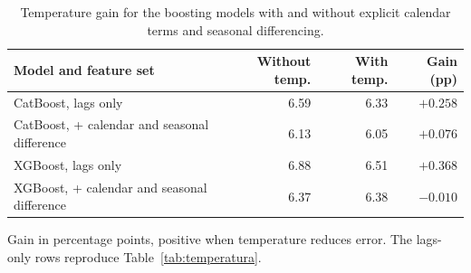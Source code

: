 \begin{table}[htbp]
\centering
\small
\setlength{\tabcolsep}{5pt}
\caption{Temperature gain for the boosting models with and without explicit calendar terms and seasonal differencing.}
\label{tab:tempdiffcal}
\begin{tabular}{lrrr}
\toprule
Model and feature set & Without temp. & With temp. & Gain (pp) \\
\midrule
CatBoost, lags only & 6.59 & 6.33 & $+0.258$ \\
CatBoost, + calendar and seasonal difference & 6.13 & 6.05 & $+0.076$ \\
\midrule
XGBoost, lags only & 6.88 & 6.51 & $+0.368$ \\
XGBoost, + calendar and seasonal difference & 6.37 & 6.38 & $-0.010$ \\
\bottomrule
\end{tabular}

\vspace{0.5em}
\begin{minipage}{\textwidth}
\footnotesize
Gain in percentage points, positive when temperature reduces error. The lags-only rows reproduce Table~\ref{tab:temperatura}.
\end{minipage}
\end{table}
